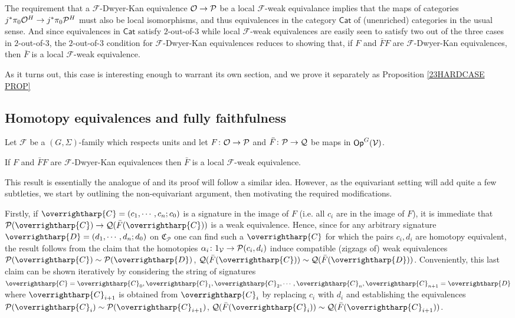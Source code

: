 \documentclass[a4paper,10pt
,draft
]{article}%
\renewcommand{\F}{\mathcal F}
\renewcommand{\1}{\eta}%
\newcommand{\vect}[1]{\text{\overrightharp{\ensuremath{#1}}}}
\begin{document}
\begin{remark}
The requirement that 
a $\F$-Dwyer-Kan equivalence $\O \to \P$
be a local $\F$-weak equivalance
implies that the maps of categories 
$j^{\**}\pi_0 \O^H \to j^{\**}\pi_0 \P^H$
must also be local isomorphisms, 
and thus equivalences in the category $\mathsf{Cat}$
of (unenriched) categories in the usual sense.
And since equivalences in $\mathsf{Cat}$ satisfy $2$-out-of-$3$
while local $\F$-weak equivalences 
are easily seen to satisfy two out of the three cases in $2$-out-of-$3$,
the $2$-out-of-$3$ condition for 
$\F$-Dwyer-Kan equivalences reduces to showing that, 
if $F$ and $\bar{F}F$ are $\F$-Dwyer-Kan equivalences,
then $\bar{F}$ is a local $\F$-weak equivalence.

As it turns out, this case is interesting enough to warrant its own section, and we prove it separately as
Proposition \ref{23HARDCASE PROP}
\end{remark}




\subsection{Homotopy equivalences and fully faithfulness}



\begin{proposition}\label{23HARDCASE PROP}
Let $\F$ be a $(G,\Sigma)$-family which respects units and let
$F \colon \O \to \P$ and 
$\bar{F} \colon \P \to \mathcal{Q}$
be maps in $\mathsf{Op}^G(\V)$.

If $F$ and $\bar{F}F$ are $\F$-Dwyer-Kan equivalences
then $\bar{F}$ is a local $\F$-weak equivalence.
\end{proposition}


This result is essentially the analogue of
\cite[Lemma 4.14]{Cav} and its proof will follow a similar idea.
However, as the equivariant setting will add quite a few subtleties, we start by outlining the non-equivariant argument,
then motivating the required modifications.

Firstly, if $\vect{C} = (c_1,\cdots,c_n;c_0)$
is a signature in the image of $F$ (i.e. all $c_i$ are in the image of $F$),
it is immediate that 
$\P(\vect{C}) \to \mathcal{Q}(\bar{F}(\vect{C}))$
is a weak equivalence.
Hence, since for any arbitrary signature
$\vect{D} = (d_1,\cdots,d_n;d_0)$ on $\mathfrak{C}_{\mathcal{P}}$
one can find such a $\vect{C}$ for which the pairs $c_i,d_i$ are homotopy equivalent,
the result follows from the claim that the homotopies
$\alpha_i \colon 1_{\V} \to \P(c_i,d_i)$
induce compatible (zigzags of) weak equivalences
$\mathcal{P}(\vect{C}) \sim \mathcal{P}(\vect{D})$,
$\mathcal{Q}(\bar{F}(\vect{C})) \sim \mathcal{Q}(\bar{F}(\vect{D}))$.
Conveniently, this last claim can be shown iteratively by
considering the string of signatures
$\vect{C} = \vect{C}_0,\vect{C}_1,\vect{C}_2,\cdots,
\vect{C}_n,\vect{C}_{n+1} = \vect{D}$
where $\vect{C}_{i+1}$ is obtained from $\vect{C}_i$
by replacing $c_i$ with $d_i$ and establishing the equivalences
$\mathcal{P}(\vect{C}_i) \sim \mathcal{P}(\vect{C}_{i+1})$,
$\mathcal{Q}(\bar{F}(\vect{C}_i)) \sim \mathcal{Q}(\bar{F}(\vect{C}_{i+1}))$.
\end{document}
